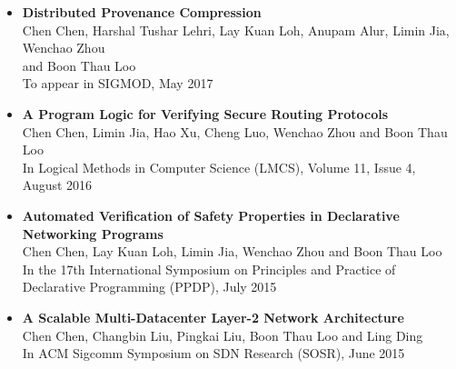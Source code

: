 \begin{itemize} \itemsep -2pt %
\item {\bf Distributed Provenance Compression} \\
Chen Chen, Harshal Tushar Lehri, Lay Kuan Loh, Anupam Alur, Limin Jia,
Wenchao Zhou \\ and Boon Thau Loo\\
To appear in SIGMOD, May 2017\\
\item {\bf A Program Logic for Verifying Secure Routing Protocols} \\
Chen Chen, Limin Jia, Hao Xu, Cheng Luo, Wenchao Zhou and Boon Thau
Loo\\
In Logical Methods in Computer Science (LMCS), Volume 11, Issue 4, August 2016\\
\item {\bf Automated Verification of Safety Properties in Declarative Networking
    Programs} \\
Chen Chen, Lay Kuan Loh, Limin Jia, Wenchao Zhou and Boon Thau Loo\\
In the 17th International Symposium on Principles and Practice of Declarative
Programming (PPDP), July 2015\\
\item {\bf A Scalable Multi-Datacenter Layer-2 Network Architecture} \\
Chen Chen, Changbin Liu, Pingkai Liu, Boon Thau Loo and Ling Ding\\
In ACM Sigcomm Symposium on SDN Research (SOSR), June 2015\\



\end{itemize}
